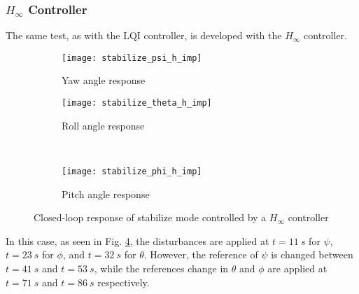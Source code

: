 \subsubsection{$H_\infty$ Controller}
The same test, as with the LQI controller, is developed with the $H_\infty$ controller.
\begin{figure}[H]
\begin{subfigure}{.5\linewidth}
\centering
\texttt{[image: stabilize\_psi\_h\_imp]}
\caption{Yaw angle response}
\label{fig:stabilize_psi_h_imp}
\end{subfigure}%
\begin{subfigure}{.5\linewidth}
\centering
\texttt{[image: stabilize\_theta\_h\_imp]}
\caption{Roll angle response}
\label{fig:stabilize_theta_h_imp}
\end{subfigure}\\[1ex]
\begin{subfigure}{\linewidth}
\centering
\texttt{[image: stabilize\_phi\_h\_imp]}
\caption{Pitch angle response}
\label{fig:stabilize_psi_h_imp}
\end{subfigure}
\caption{Closed-loop response of stabilize mode controlled by a $H_\infty$ controller}
\label{fig:stabilize_h_imp}
\end{figure}
In this case, as seen in Fig. \ref{fig:stabilize_h_imp}, the disturbances are applied at $t = 11\ s$ for $\psi$, $t = 23\ s$ for $\phi$, and $t = 32\ s$ for $\theta$. However, the reference of $\psi$ is changed between $t = 41\ s$ and $t = 53\ s$, while the references change in $\theta$ and $\phi$ are applied at $t = 71\ s$ and $t = 86\ s$ respectively.

